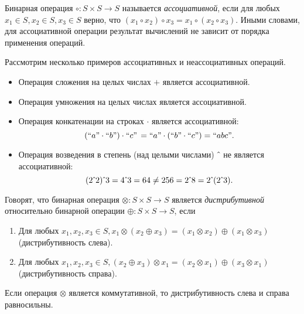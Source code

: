 \begin{definition}
Бинарная операция $\circ : S \times S \to S$ называется \emph{ассоциативной}, если для любых  $x_1 \in S, x_2 \in S, x_3 \in S$ верно, что  $(x_1 \circ x_2) \circ x_3 = x_1 \circ (x_2 \circ x_3)$. Иными словами, для ассоциативной операции результат вычислений не зависит от порядка применения операций.
\end{definition}

\begin{example} Рассмотрим несколько примеров ассоциативных и неассоциативных операций.
	\begin{itemize}
		\item Операция сложения на целых числах $+$ является ассоциативной.
		\item Операция умножения на целых числах является ассоциативной.
		\item Операция конкатенации на строках $\cdot$ является ассоциативной: $$(``a" \cdot ``b") \cdot ``c" \, = ``a" \cdot (``b" \cdot ``c") = ``abc" .$$
		\item Операция возведения в степень (над целыми числами) $\hat{\mkern6mu}$ не является ассоциативной:
		$$(2\hat{\mkern6mu}2)\hat{\mkern6mu}3 = 4 \hat{\mkern6mu} 3 = 64 \neq 256 = 2 \hat{\mkern6mu} 8 = 2\hat{\mkern6mu}(2\hat{\mkern6mu}3).$$
	\end{itemize}
\end{example}


\begin{definition}
Говорят, что бинарная операция $\otimes : S \times S \to S$ является \emph{дистрибутивной} относительно бинарной операции $\oplus : S \times S \to S$, если
\begin{enumerate}
	\item Для любых $x_1,x_2,x_3 \in S, x_1 \otimes (x_2 \oplus x_3) = (x_1 \otimes x_2) \oplus (x_1 \otimes x_3)$ (дистрибутивность слева).
	\item Для любых $x_1,x_2,x_3 \in S, (x_2 \oplus x_3) \otimes x_1 = (x_2 \otimes x_1) \oplus (x_3 \otimes x_1)$ (дистрибутивность справа).
\end{enumerate}

Если операция $\otimes$ является коммутативной, то дистрибутивность слева и справа равносильны.

\end{definition}

